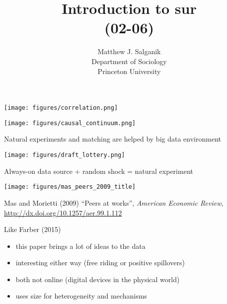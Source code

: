 \documentclass[aspectratio=169]{beamer}
\title[]{Introduction to sur\\(02-06)}
\author[]{Matthew J. Salganik\\Department of Sociology\\Princeton University}
\date[]{Soc 596: Computational Social Science\\Fall 2016
\vfill
\begin{flushright}
\vspace{0.6in}
\texttt{[image: figures/cc.png]}
\end{flushright}
}
\def\vf{\vfill}
\begin{document}
\frame{\titlepage}
\begin{frame}

\begin{center}
\texttt{[image: figures/correlation.png]}
\end{center}

\vf
{}

\end{frame}
\begin{frame}

\begin{center}
\texttt{[image: figures/causal\_continuum.png]}
\end{center}

\vf
Natural experiments and matching are helped by big data environment

\end{frame}
\begin{frame}

\begin{center}
\texttt{[image: figures/draft\_lottery.png]}
\end{center}

\vf
{}

\end{frame}
\begin{frame}

Always-on data source + random shock = natural experiment

\end{frame}
\begin{frame}

\begin{center}
\texttt{[image: figures/mas\_peers\_2009\_title]}
\end{center}

\vf
Mas and Morietti (2009) ``Peers at works'', \textit{American Economic Review}, \url{http://dx.doi.org/10.1257/aer.99.1.112}

\end{frame}
\begin{frame}

Like Farber (2015)
\begin{itemize}
\item this paper brings a lot of ideas to the data
\item interesting either way (free riding or positive spillovers)
\item both not online (digital devices in the physical world)
\item uses size for heterogeneity and mechanisms
\end{itemize}

\end{frame}
\end{document}
